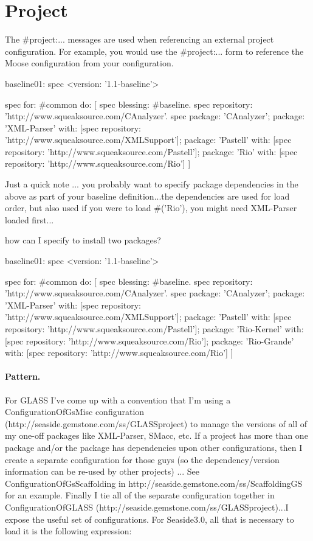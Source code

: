 \documentclass[a4paper,10pt,twoside]{book}
\begin{document}
\section{Project}
The \#project:... messages are used when referencing an external project configuration. For example, you would use the \#project:... form to reference the Moose configuration from your configuration.



  \begin{code}{}
  baseline01: spec 
  	<version: '1.1-baseline'>
  	
  	spec for: #common do: [
  		spec blessing: #baseline.
  		spec repository: 'http://www.squeaksource.com/CAnalyzer'.
  		spec 
  			package: 'CAnalyzer';
  			package: 'XML-Parser' with: [spec repository: 'http://www.squeaksource.com/XMLSupport'];
  			package: 'Pastell' with: [spec repository: 'http://www.squeaksource.com/Pastell'];
  			package: 'Rio' with: [spec repository: 'http://www.squeaksource.com/Rio']
  			]
	\end{code}

Just a quick note ... you probably want to specify package dependencies in the above as part of your baseline definition...the dependencies are used for load order, but also used if you were to load \#('Rio'), you might need XML-Parser loaded first... 


how can I specify to install two packages?
 
\begin{code}{}
baseline01: spec 
 	<version: '1.1-baseline'>
 	
 	spec for: #common do: [
 		spec blessing: #baseline.
 		spec repository: 'http://www.squeaksource.com/CAnalyzer'.
 		spec 
 			package: 'CAnalyzer';
 			package: 'XML-Parser' with: [spec repository: 'http://www.squeaksource.com/XMLSupport'];
 			package: 'Pastell' with: [spec repository: 'http://www.squeaksource.com/Pastell'];
 			package: 'Rio-Kernel' with: [spec repository: 'http://www.squeaksource.com/Rio'];
 			package: 'Rio-Grande' with: [spec repository: 'http://www.squeaksource.com/Rio']
 			]
\end{code}



\paragraph{Pattern.} For GLASS I've come up with a convention that I'm using a ConfigurationOfGsMisc configuration (http://seaside.gemstone.com/ss/GLASSproject) to manage the versions of all of my one-off packages like XML-Parser, SMacc, etc. If a project has more than one package and/or the package has dependencies upon other configurations, then I create a separate configuration for those guys (so the dependency/version information can be re-used by other projects) ... See ConfigurationOfGsScaffolding in http://seaside.gemstone.com/ss/ScaffoldingGS for an example. Finally I tie all of the separate configuration together in ConfigurationOfGLASS (http://seaside.gemstone.com/ss/GLASSproject)...I expose the useful set of configurations. For Seaside3.0, all that is necessary to load it is the following expression:
\end{document}

